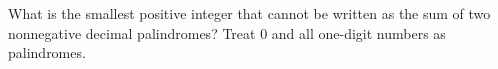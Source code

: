 What is the smallest positive integer that cannot be written as the sum of two nonnegative decimal palindromes? Treat 0 and all one-digit numbers as palindromes.
